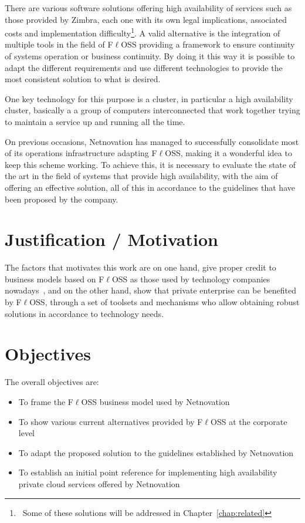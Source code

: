 \documentclass[a4paper, 12pt]{book}
\begin{document}
\noindent There are various software solutions offering high availability of services such as those provided by Zimbra, each one with its own legal implications, associated costs and implementation difficulty\footnote{\ Some of these solutions will be addressed in Chapter~\ref{chap:related}}. A valid alternative is the integration of multiple tools in the field of F$\ell$OSS providing a framework to ensure  continuity of systems operation or business continuity. By doing it this way it is possible to adapt the different requirements and use different technologies to provide the most consistent solution to what is desired.\bigskip

\noindent One key technology for this purpose is a cluster, in particular a high availability cluster, basically a a group of computers interconnected that work together trying to maintain a service up and running all the time.\bigskip

\noindent On previous occasions, Netnovation has managed to successfully consolidate most of its operations infrastructure adapting F$\ell$OSS, making it a wonderful idea to keep this scheme working. To achieve this, it is necessary to evaluate the state of the art in the field of systems that provide high availability, with the aim of offering an effective solution, all of this in accordance to the guidelines that have been proposed by the company.


\section{Justification / Motivation}
\label{sec:justification}

The factors that motivates this work are on one hand, give proper credit to business models based on F$\ell$OSS as those used by technology companies nowadays~\cite{Daffara2}, and on the other hand, show that private enterprise can be benefited by F$\ell$OSS, through a set of toolsets and mechanisms who allow obtaining robust solutions in accordance to technology needs.

\section{Objectives}
\label{sec:objectives}

The overall objectives are:

\begin{itemize}
	\item To frame the F$\ell$OSS business model used by Netnovation
	\item To show various current alternatives provided by F$\ell$OSS at the corporate level
	\item To adapt the proposed solution to the guidelines established by Netnovation
	\item To establish an initial point reference for implementing high availability private cloud services offered by Netnovation
\end{itemize}
\end{document}
